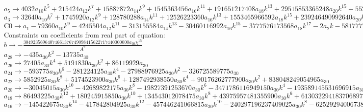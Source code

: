 \documentclass[12pt,a4paper,draft]{article}
\begin{document}
$a_{5}\to 4032 a_{10} k^5+215424 a_{12} k^7+15887872 a_{14} k^9+1545363456 a_{16} k^{11}+191651217408 a_{18} k^{13}+29515853365248 a_{20} k^{15}+5526593941929984 a_{22} k^{17}+1236393972835811328 a_{24} k^{19}+325709541934503034880 a_{26} k^{21}+99795859565893449154560 a_{28} k^{23}+35187792455985778913181696 a_{30} k^{25}+6 a_{6} k+112 a_{8} k^3$\\
$a_{3}\to 32640 a_{10} k^7+1745920 a_{12} k^9+128780288 a_{14} k^{11}+12526223360 a_{16} k^{13}+1553465966592 a_{18} k^{15}+239246490992640 a_{20} k^{17}+44796883073761280 a_{22} k^{19}+10021832059523170304 a_{24} k^{21}+2640102104917816115200 a_{26} k^{23}+808914769103121354326016 a_{28} k^{25}+285221502512012477144760320 a_{30} k^{27}+4 a_{4} k+40 a_{6} k^3+896 a_{8} k^5$\\
$\text{C0}\to a_{1}-79360 a_{10} k^9-4245504 a_{12} k^{11}-313155584 a_{14} k^{13}-30460116992 a_{16} k^{15}-3777576173568 a_{18} k^{17}-2 a_{2} k-581777702256640 a_{20} k^{19}-108932957168730112 a_{22} k^{21}-24370173276164456448 a_{24} k^{23}-6419958484945407574016 a_{26} k^{25}-1967044844910430876860416 a_{28} k^{27}-693575525634287935244206080 a_{30} k^{29}-8 a_{4} k^3-96 a_{6} k^5-2176 a_{8} k^7$\\
Constraints on coefficients from real part of equation:
\\$b\to -\frac{30492356964074661376749098415622717440000000 a_{30} \chi ^{15}}{A^2}$\\
$a_{28}\to -435 a_{30} k^2-13735 a_{30}$\\
$a_{26}\to 27405 a_{30} k^4+5191830 a_{30} k^2+86119929 a_{30}$\\
$a_{24}\to -593775 a_{30} k^6-281224125 a_{30} k^4-27988976925 a_{30} k^2-326725589775 a_{30}$\\
$a_{22}\to 5852925 a_{30} k^8+5174523900 a_{30} k^6+1287492938550 a_{30} k^4+90176262777900 a_{30} k^2+838048249054965 a_{30}$\\
$a_{20}\to -30045015 a_{30} k^{10}-42689822175 a_{30} k^8-19827391253670 a_{30} k^6-3471786116949150 a_{30} k^4-193589145531696915 a_{30} k^2-1538070385569865875 a_{30}$\\
$a_{18}\to 86493225 a_{30} k^{12}+180245915850 a_{30} k^{10}+134543012078475 a_{30} k^8+43975957481355900 a_{30} k^6+6130322941837068975 a_{30} k^4+292233373258274516250 a_{30} k^2+2084625297546283166205 a_{30}$\\
$a_{16}\to -145422675 a_{30} k^{14}-417842804925 a_{30} k^{12}-457446241066815 a_{30} k^{10}-240297196237409025 a_{30} k^8-62529294006738103545 a_{30} k^6-7451951018086000164375 a_{30} k^4-318947670524581324429365 a_{30} k^2-2122653259653203927325675 a_{30}$\\
\end{document}
